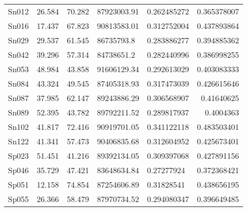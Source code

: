 \begin{table}[!ht]
\begin{tabularx}{\textwidth}{@{}WrZZZr@{}}
Sn012                   & 26.584           & 70.282           & 87923003.91   & 0.262485272                   & 0.365378007                           \\
Sn016                   & 17.437           & 67.823           & 90813583.01   & 0.312752004                   & 0.437893864                           \\
Sn029                   & 29.537           & 61.545           & 86735793.8    & 0.283886277                   & 0.394885362                           \\
Sn042                   & 39.296           & 57.314           & 84738651.2    & 0.282440996                   & 0.386998255                           \\
Sn053                   & 48.984           & 43.858           & 91606129.34   & 0.292613029                   & 0.403083333                           \\
Sn084                   & 43.324           & 49.545           & 87405318.93   & 0.317473039                   & 0.426615646                           \\
Sn087                   & 37.985           & 62.147           & 89243886.29   & 0.306568907                   & 0.41640625                            \\
Sn089                   & 52.395           & 43.782           & 89792211.52   & 0.289817937                   & 0.4004363                             \\
Sn102                   & 41.817           & 72.416           & 90919701.05   & 0.341122118                   & 0.483503401                           \\
Sn122                   & 41.341           & 57.473           & 90406835.68   & 0.312604952                   & 0.425673401                           \\
Sp023                   & 51.451           & 41.216           & 89392134.05   & 0.309397068                   & 0.427891156                           \\
Sp046                   & 35.729           & 47.421           & 83648634.84   & 0.27277924                    & 0.372368421                           \\
Sp051                   & 12.158           & 74.854           & 87254606.89   & 0.31828541                    & 0.438656195                           \\
Sp055                   & 26.366           & 58.479           & 87970734.52   & 0.294080347                   & 0.396649485                           \\

\end{tabularx}
\end{table}
